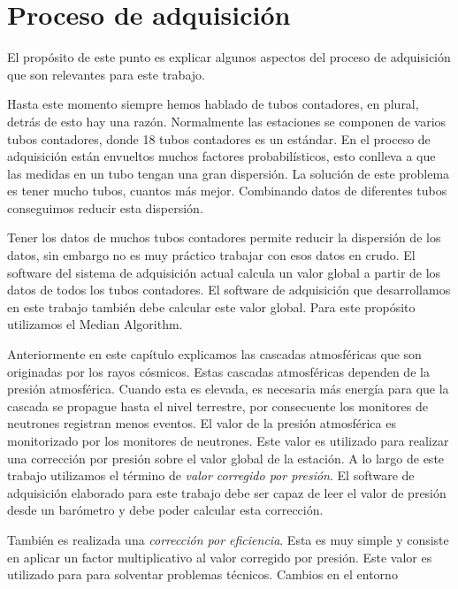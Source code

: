 \section{Proceso de adquisición}
	El propósito de este punto es explicar algunos aspectos del proceso de adquisición que son relevantes para este trabajo.
	\begin{description}[leftmargin=0cm]
		\item[Múltiples Tubos]
			Hasta este momento siempre hemos hablado de tubos contadores, en plural, detrás de esto hay una razón. Normalmente las
			estaciones se componen de varios tubos contadores, donde 18 tubos contadores es un estándar. En el proceso de adquisición
			están envueltos muchos factores probabilísticos, esto conlleva a que las medidas en un tubo tengan una gran dispersión. La
			solución de este problema es tener mucho tubos, cuantos más mejor. Combinando datos de diferentes tubos conseguimos reducir
			esta dispersión. 
		\item[Valor global]
		  	Tener los datos de muchos tubos contadores permite reducir la dispersión de los datos, sin embargo no es muy práctico trabajar
			con esos datos en crudo. El software del sistema de adquisición actual calcula un valor global a partir de los datos de todos
			los tubos contadores. El software de adquisición que desarrollamos en este trabajo también debe calcular este valor global.
			Para este propósito utilizamos el Median Algorithm\cite{MedianAlgr}.
		\item[Correcciónes]
			Anteriormente en este capítulo explicamos las cascadas atmosféricas que son originadas por los rayos cósmicos. Estas cascadas
			atmosféricas dependen de la presión atmosférica. Cuando esta es elevada, es necesaria más energía para que la cascada se
			propague hasta el nivel terrestre, por consecuente los monitores de neutrones registran menos eventos. El valor de la presión
			atmosférica es monitorizado por los monitores de neutrones. Este valor es utilizado para realizar una corrección por presión
			sobre el valor global de la estación. A lo largo de este trabajo utilizamos el término de \emph{valor corregido por presión}.
			El software de adquisición elaborado para este trabajo debe ser capaz de leer el valor de presión desde un barómetro y debe
			poder calcular esta corrección. 
			\par
			También es realizada una \emph{corrección por eficiencia}. Esta es muy simple y consiste en aplicar un factor multiplicativo
			al valor corregido por presión. Este valor es utilizado para para solventar problemas técnicos. Cambios en el entorno

\end{description}
